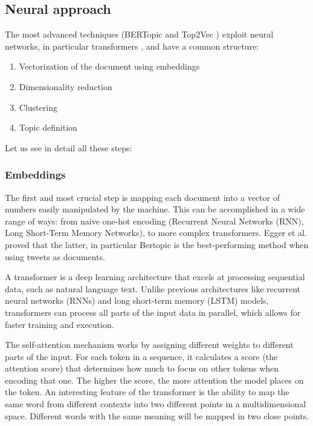 \subsection{Neural approach}

The most advanced techniques (BERTopic \cite{grootendorst_bertopic_2022} and Top2Vec \cite{angelov_top2vec_2020})  exploit neural networks, in particular transformers \cite{vaswani_attention_2017}, and have a common structure: 

\begin{enumerate}
    \item Vectorization of the document using embeddings
    \item Dimensionality reduction
    \item Clustering
    \item Topic definition
\end{enumerate}

Let us see in detail all these steps:

\subsubsection{Embeddings}

The first and most crucial step is mapping each document into a vector of numbers  easily manipulated by the machine. This can be accomplished in a wide range of  ways: from naive one-hot encoding (Recurrent Neural Networks (RNN), Long Short-Term Memory Networks), to more complex transformers. Egger et al. \cite{egger_topic_2022} proved that the latter, in particular Bertopic is the best-performing method when using tweets as documents.

A transformer \cite{vaswani_attention_2017}  is a deep learning architecture that excels at processing sequential data, such as natural language text. Unlike previous architectures like recurrent neural networks (RNNs) and long short-term memory (LSTM) models, transformers can process all parts of the input data in parallel, which allows for faster training and execution.

The self-attention mechanism works by assigning different weights to different parts of the input. For each token in a sequence, it calculates a score (the attention score) that determines how much to focus on other tokens when encoding that one. The higher the score, the more attention the model places on the token. An interesting feature of the transformer is the ability to map the same word from different contexts into two different points in a multidimensional space. Different words with the same meaning will be mapped in two close points.

